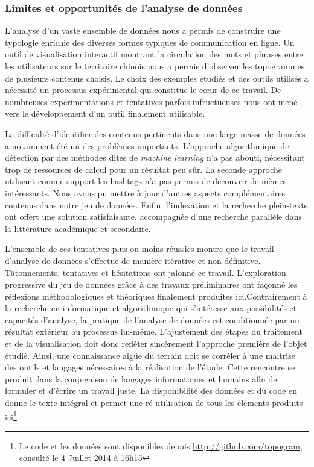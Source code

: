 \subsubsection{Limites et opportunités de l'analyse de données}

L'analyse d'un vaste ensemble de données nous a permis de construire une typologie enrichie des diverses formes typiques de communication en ligne. Un outil de visualisation interactif montrant la circulation des mots et phrases entre les utilisateurs sur le territoire chinois nous a permis d'observer les topogrammes de plusieurs contenus choisis. Le choix des exemples étudiés et des outils utilisés a  nécessité un processus expérimental qui constitue le cœur de ce travail. De nombreuses expérimentations et tentatives parfois infructueuses nous ont mené vers le développement d'un outil finalement utilisable.

La difficulté d'identifier des contenus pertinents dans une large masse de données a notamment été un des problèmes importants. L'approche algorithmique de détection par des méthodes dites de \textit{machine learning} n'a pas abouti, nécessitant trop de ressources de calcul pour un résultat peu sûr. La seconde approche utilisant comme support les hashtags n'a pas permis de découvrir de mèmes intéressants. Nous avons pu mettre à jour d'autres aspects complémentaires contenus dans notre jeu de données. Enfin, l'indexation et la recherche plein-texte ont offert une solution satisfaisante, accompagnée d'une recherche parallèle dans la littérature académique et secondaire.

L'ensemble de ces tentatives plus ou moins réussies montre que le travail d'analyse de données s'effectue de manière itérative et non-définitive. Tâtonnements, tentatives et hésitations ont jalonné ce travail. L'exploration progressive du jeu de données grâce à des travaux préliminaires ont façonné les réflexions méthodologiques et théoriques finalement produites ici.Contrairement à la recherche en informatique et algorithmique qui s'intéresse aux possibilités et capacités d'analyse, la pratique de l'analyse de données est conditionnée par un résultat extérieur au processus lui-même. L'ajustement des étapes du traitement et de la visualisation doit donc refléter sincèrement l'approche première de l'objet étudié. Ainsi, une connaissance aigüe du terrain doit se corréler à une maitrise des outils et langages nécessaires à la réalisation de l'étude. Cette rencontre se produit dans la conjugaison de langages informatiques et humains afin de formuler et d'écrire un travail juste. La disponibilité des données et du code en donne le texte intégral et permet une ré-utilisation de tous les éléments produits ici\footnote{Le code et les données sont disponibles depuis \url{http://github.com/topogram}, consulté le 4 Juillet 2014 à 16h15}. 

